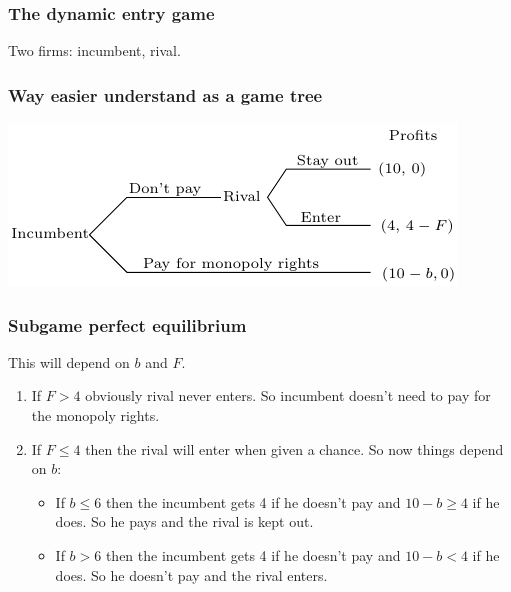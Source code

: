 \documentclass[xcolor=pdftex,dvipsnames]{beamer}
\begin{document}
\begin{frame}
  \frametitle{The dynamic entry game}
  Two firms: incumbent, rival.
\bigskip

\bigskip

\bigskip

\bigskip

\bigskip


\end{frame}

\begin{frame}
  \frametitle{Way easier understand as a game tree}
  \begin{center}
    \includegraphics{pics/Entrygame}
  \end{center}

\end{frame}


\begin{frame}
  \frametitle{Subgame perfect equilibrium}
  This will depend on $b$ and $F$.

  \begin{enumerate}
  \item<2-> If $F>4$ obviously rival never enters. So incumbent
    doesn't need to pay for the monopoly rights.
  \item<3-> If $F\leq 4$ then the rival will enter when given a
    chance. So now things depend on $b$:
    \begin{itemize}
    \item<4-> If $b\leq 6$ then the incumbent gets 4 if he doesn't pay
      and $10-b \geq 4$ if he does. So he pays and the rival is kept
      out.
    \item<5-> If $b>6$ then the incumbent gets 4 if he doesn't pay and
      $10-b < 4$ if he does. So he doesn't pay and the rival enters.
    \end{itemize}
  \end{enumerate}
\end{frame}
\end{document}
